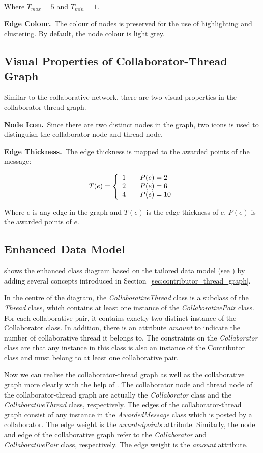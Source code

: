 Where \(T_{max} = 5\) and \(T_{min} = 1\).

\textbf{Edge Colour.}~The colour of nodes is preserved for the use of highlighting and clustering. By default, the node colour is light grey.

\subsection{Visual Properties of Collaborator-Thread Graph}
Similar to the collaborative network, there are two visual properties in the collaborator-thread graph.

\textbf{Node Icon.}~Since there are two distinct nodes in the graph, two icons is used to distinguish the collaborator node and thread node.

\textbf{Edge Thickness.}~The edge thickness is mapped to the awarded points of the message:

\[T(e) = \left\{\begin{array}{l l}
    1 \quad \quad P(e) = 2\\
    2 \quad \quad P(e) = 6\\
    4 \quad \quad P(e) = 10
  \end{array} \right.
\]

Where \(e\) is any edge in the graph and \(T(e)\) is the edge thickness of \(e\). \(P(e)\) is the awarded points of \(e\).

\subsection{Enhanced Data Model}

 shows the enhanced class diagram based on the tailored data model (see ) by adding several concepts introduced in Section~\ref{sec:contributor_thread_graph}.
 
In the centre of the diagram, the \emph{CollaborativeThread} class is a subclass of the \emph{Thread} class, which contains at least one instance of the \emph{CollaborativePair} class. For each collaborative pair, it contains exactly two distinct instance of the Collaborator class. In addition, there is an attribute \emph{amount} to indicate the number of collaborative thread it belongs to. The constraints on the \emph{Collaborator} class are that any instance in this class is also an instance of the Contributor class and must belong to at least one collaborative pair.

Now we can realise the collaborator-thread graph as well as the collaborative graph more clearly with the help of . The collaborator node and thread node of the collaborator-thread graph are actually the \emph{Collaborator} class and the \emph{CollaborativeThread} class, respectively. The edges of the collaborator-thread graph consist of any instance in the \emph{AwardedMessage} class which is posted by a collaborator. The edge weight is the \emph{awardedpoints} attribute. Similarly, the node and edge of the collaborative graph refer to the \emph{Collaborator} and \emph{CollaborativePair} class, respectively. The edge weight is the \emph{amount} attribute.

